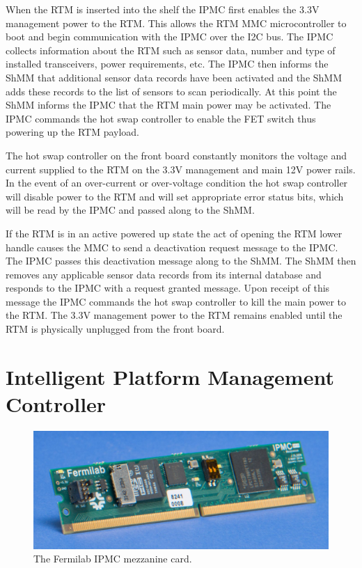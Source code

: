 \documentclass[letterpaper]{article}
\begin{document}
When the RTM is inserted into the shelf the IPMC first enables the 3.3V management power to the RTM.  This allows the RTM MMC microcontroller to boot and begin communication with the IPMC over the I2C bus.  The IPMC collects information about the RTM such as sensor data, number and type of installed transceivers, power requirements, etc.  The IPMC then informs the ShMM that additional sensor data records have been activated and the ShMM adds these records to the list of sensors to scan periodically.  At this point the ShMM informs the IPMC that the RTM main power may be activated.  The IPMC commands the hot swap controller to enable the FET switch thus powering up the RTM payload.

The hot swap controller on the front board constantly monitors the voltage and current supplied to the RTM on the 3.3V management and main 12V power rails.  In the event of an over-current or over-voltage condition the hot swap controller will disable power to the RTM and will set appropriate error status bits, which will be read by the IPMC and passed along to the ShMM.

If the RTM is in an active powered up state the act of opening the RTM lower handle causes the MMC to send a deactivation request message to the IPMC.  The IPMC passes this deactivation message along to the ShMM.  The ShMM then removes any applicable sensor data records from its internal database and responds to the IPMC with a request granted message.  Upon receipt of this message the IPMC commands the hot swap controller to kill the main power to the RTM.  The 3.3V management power to the RTM remains enabled until the RTM is physically unplugged from the front board.


\section{Intelligent Platform Management Controller}
\label{ipmc_section}

\begin{figure}
\centering
\includegraphics[width=12cm]{fnal_ipmc.jpg}
\caption{The Fermilab IPMC mezzanine card.}
\label{fnal_ipmc}
\end{figure}
\end{document}
